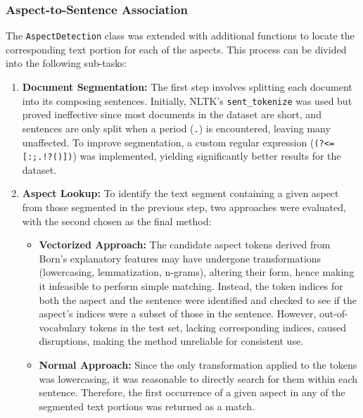 \subsubsection{Aspect-to-Sentence Association}\label{sec:aspect_to_sent}

The \texttt{AspectDetection} class was extended with additional functions to locate the corresponding text portion for each of the aspects. This process can be divided into the following sub-tasks:

\begin{enumerate}
    \item \textbf{Document Segmentation:} The first step involves splitting each document into its composing sentences. Initially, NLTK's \texttt{sent\_tokenize} was used but proved ineffective since most documents in the dataset are short, and sentences are only split when a period (\texttt{.}) is encountered, leaving many unaffected. To improve segmentation, a custom regular expression (\texttt{(?<=[:;.!?()])}) was implemented, yielding significantly better results for the dataset.

    \item \textbf{Aspect Lookup:} To identify the text segment containing a given aspect from those segmented in the previous step, two approaches were evaluated, with the second chosen as the final method:
    
    \begin{itemize}
        \item \textbf{Vectorized Approach:} The candidate aspect tokens derived from Born's explanatory features may have undergone transformations (lowercasing, lemmatization, n-grams), altering their form, hence making it infeasible to perform simple matching. Instead, the token indices for both the aspect and the sentence were identified and checked to see if the aspect's indices were a subset of those in the sentence. However, out-of-vocabulary tokens in the test set, lacking corresponding indices, caused disruptions, making the method unreliable for consistent use.

        \item \textbf{Normal Approach:} Since the only transformation applied to the tokens was lowercasing, it was reasonable to directly search for them within each sentence. Therefore, the first occurrence of a given aspect in any of the segmented text portions was returned as a match.
    \end{itemize}
\end{enumerate}

